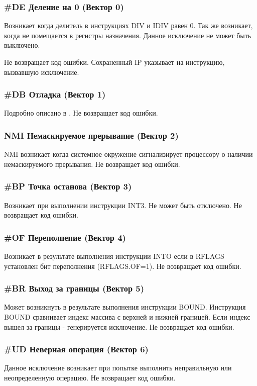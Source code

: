 \subsubsection*{\#DE Деление на 0 (Вектор 0)}
Возникает когда делитель в инструкциях DIV и IDIV равен 0. Так же возникает,
когда не помещается в регистры назначения. Данное исключение не может быть
выключено.

Не возвращает код ошибки. Сохраненный IP указывает на инструкцию, вызвавшую
исключение.

\subsubsection*{\#DB Отладка (Вектор 1)}
Подробно описано в \cite{amd_pm_v2}. Не возвращает код ошибки.

\subsubsection*{NMI Немаскируемое прерывание (Вектор 2)}
NMI возникает когда системное окружение сигнализирует процессору о наличии
немаскируемого прерывания. Не возвращает код ошибки.

\subsubsection*{\#BP Точка останова (Вектор 3)}
Возникает при выполнении инструкции INT3. Не может быть отключено. Не
возвращает код ошибки.

\subsubsection*{\#OF Переполнение (Вектор 4)}
Возникает в результате выполнения инструкции INTO если в RFLAGS установлен бит
переполнения (RFLAGS.OF=1). Не возвращает код ошибки.

\subsubsection*{\#BR Выход за границы (Вектор 5)}
Может возникнуть в результате выполнения инструкции BOUND. Инструкция BOUND
сравнивает индекс массива с верхней и нижней границей. Если индекс вышел за
границы - генерируется исключение. Не возвращает код ошибки.

\subsubsection*{\#UD Неверная операция (Вектор 6)}
Данное исключение возникает при попытке выполнить неправильную или
неопределенную операцию. Не возвращает код ошибки.

